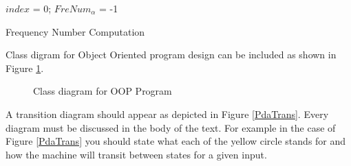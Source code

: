 \begin{algorithm}[t]
	$index$ = 0; $FreNum_{\alpha}$ = -1\;
	\caption{Frequency Number Computation}
	\label{alg:two}
\end{algorithm}

Class digram for Object Oriented program design can be included as shown in Figure \ref{ClassDiag}.



\begin{figure}[!h]
	\centering
	\caption{Class diagram for OOP Program}
	\label{ClassDiag}
\end{figure}



A transition diagram should appear as depicted in Figure \ref{PdaTrans}. Every diagram must be discussed in the body of the text. For example in the case of Figure \ref{PdaTrans} you should state what each of the yellow circle stands for and how the machine will transit between states for a given input.


